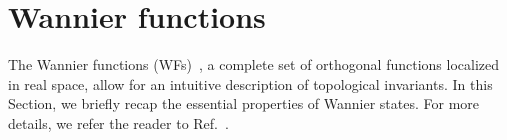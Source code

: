 %
%

\chapter{Wannier functions}
\label{ch:app_wannier}
The Wannier functions (WFs)~\cite{PhysRev.52.191}, a complete set of orthogonal functions localized in real space, allow for an intuitive description of topological invariants. In this Section, we briefly recap the essential properties of Wannier states. For more details, we refer the reader to Ref.~\cite{MarziariWF2012}.


